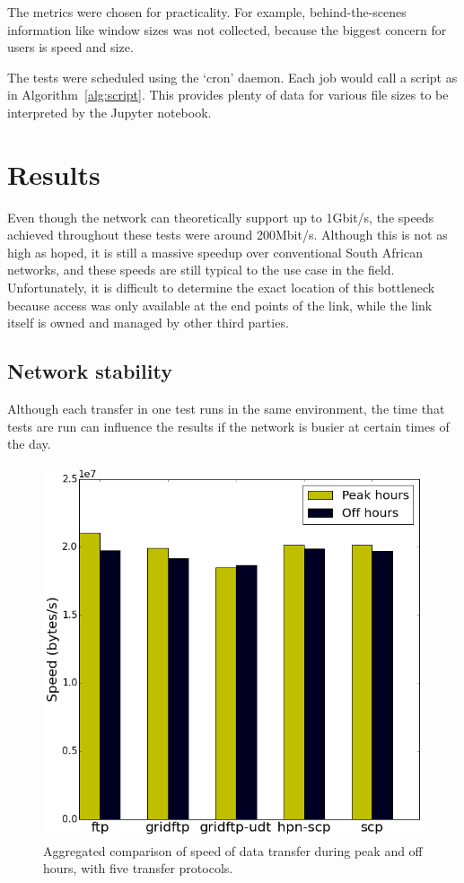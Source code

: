 \documentclass{sig-alternate-05-2015}
\begin{document}
The metrics were chosen for practicality. For example, behind-the-scenes information like window sizes was not collected, because the biggest concern for users is speed and size.

The tests were scheduled using the `cron' daemon. Each job would call a script as in Algorithm~\ref{alg:script}. This provides plenty of data for various file sizes to be interpreted by the Jupyter notebook.

\section{Results}
Even though the network can theoretically support up to 1Gbit/s, the speeds achieved throughout these tests were around 200Mbit/s. Although this is not as high as hoped, it is still a massive speedup over conventional South African networks, and these speeds are still typical to the use case in the field. Unfortunately, it is difficult to determine the exact location of this bottleneck because access was only available at the end points of the link, while the link itself is owned and managed by other third parties.

\subsection{Network stability}
Although each transfer in one test runs in the same environment, the time that tests are run can influence the results if the network is busier at certain times of the day.

\begin{figure}[h]
\centering
\includegraphics[width=.8\linewidth]{img/peak.png}
\caption{Aggregated comparison of speed of data transfer during peak and off hours, with five transfer protocols.}
\label{fig:peak}
\end{figure}
\end{document}
